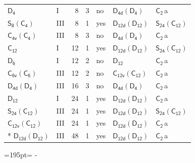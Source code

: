 \documentclass[10pt,a4paper]{article}
\newcommand{\needspace}[1]{\par\penalty-100\begingroup\dimen0=#1\relax\dimen2=\pagegoal
  \advance\dimen2-\pagetotal\ifdim\dimen0>\dimen2\relax\ifdim\dimen2>0pt\vfil\break\fi\fi
  \endgroup}
\numberwithin{equation}{section}
\newcommand{\grp}[1]{\mathsf{#1}}
\newcommand{\clsletter}[1]{\,{\scriptsize\color{black!55}#1}}
\begin{document}
{\begin{longtable}{@{}llrrlll@{}}
\href{../../../rotation/data/pdf/D4.pdf}{$\grp{D_{4}}$} & I & 8 & 3 & no & \href{D4d-D4.pdf}{$\grp{D_{4d}}(\grp{D_{4}})$} & \href{../../../rotation/data/pdf/C2.pdf}{$\grp{C_{2}}$}\clsletter{a}\\
\href{S8-C4.pdf}{$\grp{S_{8}}(\grp{C_{4}})$} & III & 8 & 1 & yes & \href{D12d-D12.pdf}{$\grp{D_{12d}}(\grp{D_{12}})$} & \href{S24-C12.pdf}{$\grp{S_{24}}(\grp{C_{12}})$}\\
\href{C4v-C4.pdf}{$\grp{C_{4v}}(\grp{C_{4}})$} & III & 8 & 3 & no & \href{D4d-D4.pdf}{$\grp{D_{4d}}(\grp{D_{4}})$} & \href{../../../rotation/data/pdf/C2.pdf}{$\grp{C_{2}}$}\clsletter{a}\\
\href{../../../rotation/data/pdf/C12.pdf}{$\grp{C_{12}}$} & I & 12 & 1 & yes & \href{D12d-D12.pdf}{$\grp{D_{12d}}(\grp{D_{12}})$} & \href{S24-C12.pdf}{$\grp{S_{24}}(\grp{C_{12}})$}\\
\href{../../../rotation/data/pdf/D6.pdf}{$\grp{D_{6}}$} & I & 12 & 2 & no & \href{../../../rotation/data/pdf/D12.pdf}{$\grp{D_{12}}$} & \href{../../../rotation/data/pdf/C2.pdf}{$\grp{C_{2}}$}\clsletter{a}\\
\href{C6v-C6.pdf}{$\grp{C_{6v}}(\grp{C_{6}})$} & III & 12 & 2 & no & \href{C12v-C12.pdf}{$\grp{C_{12v}}(\grp{C_{12}})$} & \href{../../../rotation/data/pdf/C2.pdf}{$\grp{C_{2}}$}\clsletter{a}\\
\href{D4d-D4.pdf}{$\grp{D_{4d}}(\grp{D_{4}})$} & III & 16 & 3 & no & \href{D4d-D4.pdf}{$\grp{D_{4d}}(\grp{D_{4}})$} & \href{../../../rotation/data/pdf/C2.pdf}{$\grp{C_{2}}$}\clsletter{a}\\
\href{../../../rotation/data/pdf/D12.pdf}{$\grp{D_{12}}$} & I & 24 & 1 & yes & \href{D12d-D12.pdf}{$\grp{D_{12d}}(\grp{D_{12}})$} & \href{../../../rotation/data/pdf/C2.pdf}{$\grp{C_{2}}$}\clsletter{a}\\
\href{S24-C12.pdf}{$\grp{S_{24}}(\grp{C_{12}})$} & III & 24 & 1 & yes & \href{D12d-D12.pdf}{$\grp{D_{12d}}(\grp{D_{12}})$} & \href{S24-C12.pdf}{$\grp{S_{24}}(\grp{C_{12}})$}\\
\href{C12v-C12.pdf}{$\grp{C_{12v}}(\grp{C_{12}})$} & III & 24 & 1 & yes & \href{D12d-D12.pdf}{$\grp{D_{12d}}(\grp{D_{12}})$} & \href{../../../rotation/data/pdf/C2.pdf}{$\grp{C_{2}}$}\clsletter{a}\\*
\href{D12d-D12.pdf}{$\grp{D_{12d}}(\grp{D_{12}})$} & III & 48 & 1 & yes & \href{D12d-D12.pdf}{$\grp{D_{12d}}(\grp{D_{12}})$} & \href{../../../rotation/data/pdf/C2.pdf}{$\grp{C_{2}}$}\clsletter{a}\\
\bottomrule\end{longtable}}
\needspace{195pt}
\end{document}
